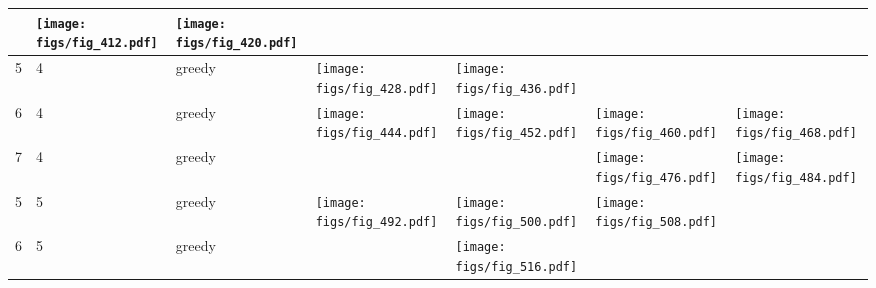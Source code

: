 \documentclass[oneside,canadian,landscape]{article}
\begin{document}
\begin{center}
\begin{longtable}{|l|l|l||l|l|l|l|}
&\begin{minipage}{3.5cm}
\texttt{[image: figs/fig\_412.pdf]}
\end{minipage}
&\begin{minipage}{3.5cm}
\texttt{[image: figs/fig\_420.pdf]}
\end{minipage}
\\ \hline
5&4&greedy&\begin{minipage}{3.5cm}
\texttt{[image: figs/fig\_428.pdf]}
\end{minipage}
&\begin{minipage}{3.5cm}
\texttt{[image: figs/fig\_436.pdf]}
\end{minipage}
&&\\ \hline
6&4&greedy&\begin{minipage}{3.5cm}
\texttt{[image: figs/fig\_444.pdf]}
\end{minipage}
&\begin{minipage}{3.5cm}
\texttt{[image: figs/fig\_452.pdf]}
\end{minipage}
&\begin{minipage}{3.5cm}
\texttt{[image: figs/fig\_460.pdf]}
\end{minipage}
&\begin{minipage}{3.5cm}
\texttt{[image: figs/fig\_468.pdf]}
\end{minipage}
\\ \hline
7&4&greedy&&&\begin{minipage}{3.5cm}
\texttt{[image: figs/fig\_476.pdf]}
\end{minipage}
&\begin{minipage}{3.5cm}
\texttt{[image: figs/fig\_484.pdf]}
\end{minipage}
\\ \hline
5&5&greedy&\begin{minipage}{3.5cm}
\texttt{[image: figs/fig\_492.pdf]}
\end{minipage}
&\begin{minipage}{3.5cm}
\texttt{[image: figs/fig\_500.pdf]}
\end{minipage}
&\begin{minipage}{3.5cm}
\texttt{[image: figs/fig\_508.pdf]}
\end{minipage}
&\\ \hline
6&5&greedy&&\begin{minipage}{3.5cm}
\texttt{[image: figs/fig\_516.pdf]}

\end{minipage}
\end{longtable}
\end{center}
\end{document}
